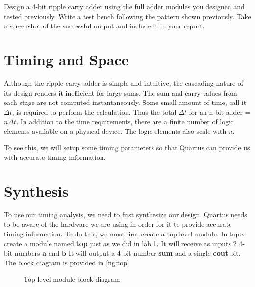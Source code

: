 \documentclass[12pt]{betterjournal}
\newcommand{\keyword}[1]{{\usefont{OT1}{lmtt}{b}{n}#1}}
\begin{document}
\hfill\break
\begin{question}
    Design a 4-bit ripple carry adder using the full adder modules you designed and tested previously. Write a test bench following the pattern shown previously. Take a screenshot of the successful output and include it in your report.
\end{question}
\section{Timing and Space}
Although the ripple carry adder is simple and intuitive, the cascading nature of its design renders it inefficient for large sums. The sum and carry values from each stage are not computed instantaneously. Some small amount of time, call it $\Delta{t}$, is required to perform the calculation. Thus the total $\Delta{t}$ for an n-bit adder = $n\Delta{t}$. In addition to the time requirements, there are a finite number of logic elements available on a physical device. The logic elements also scale with $n$.

To see this, we will setup some timing parameters so that Quartus can provide us with accurate timing information.

\section{Synthesis}
To use our timing analysis, we need to first synthesize our design. Quartus needs to be aware of the hardware we are using in order for it to provide accurate timing information. To do this, we must first create a top-level module. In \keyword{top.v} create a module named \textbf{top} just as we did in lab 1. It will receive as inputs 2 4-bit numbers $\mathbf{a}$ and $\mathbf{b}$ It will output a 4-bit number \textbf{sum} and a single \textbf{cout} bit. The block diagram is provided in \autoref{fig:top}

\begin{figure}
    \centering
    \caption{Top level module block diagram}
    \label{fig:top}
\end{figure}
\end{document}
